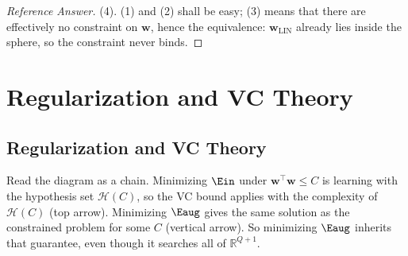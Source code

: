 \begin{proof}[Reference Answer]
    (4). (1) and (2) shall be easy; (3) means that there are effectively no
    constraint on \(\bm{w}\), hence the equivalence: \(\bm{w}_{\mathrm{LIN}}\)
    already lies inside the sphere, so the constraint never binds.
\end{proof}

\section{Regularization and VC Theory}\label{sec:reg-vc}


\subsection{Regularization and VC Theory}

\begin{center}
\end{center}

Read the diagram as a chain. Minimizing \(\Ein\) under \(\bm{w}^\top \bm{w} \le
C\) is learning with the hypothesis set \(\mathcal{H}(C)\), so the VC bound
applies with the complexity of \(\mathcal{H}(C)\) (top arrow). Minimizing
\(\Eaug\) gives the same solution as the constrained problem for some \(C\)
(vertical arrow). So minimizing \(\Eaug\) inherits that guarantee, even though
it searches all of \(\mathbb{R}^{Q+1}\).

